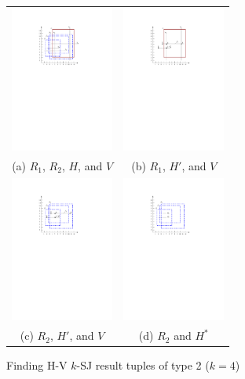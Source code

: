 \documentclass[acmsmall,review,anonymous]{acmart}
\def\figcapup{\vspace{-2mm}}
\def\figcapdown{\vspace{-3mm}}
\begin{document}
{{{\begin{figure}
    \begin{tabular}{cc}
        \includegraphics[height=48mm]{./artwork/alg-ex2-a} &
        \includegraphics[height=48mm]{./artwork/alg-ex2-b} \\
        (a) $R_1$, $R_2$, $H$, and $V$ &
        (b) $R_1$, $H'$, and $V$ \\ [2mm]
        \includegraphics[height=48mm]{./artwork/alg-ex2-c} &
        \includegraphics[height=48mm]{./artwork/alg-ex2-d} \\
        (c) $R_2$, $H'$, and $V$ &
        (d) $R_2$ and $H^*$
    \end{tabular}
    \figcapup
    \caption{Finding H-V $k$-SJ result tuples of type 2 ($k = 4$)}
    \label{fig:hv:type2:ex}
    \figcapdown
\end{figure}


}}}
\end{document}
